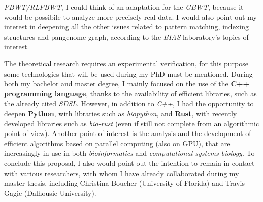 \documentclass[a4paper,11pt, oneside]{article}
\newcommand{\pb}[1]{\todo{\textbf{PB} #1}}
\newcommand{\dc}[1]{\todo{\textbf{DC} #1}}
\begin{document}
\begin{enumerate}[leftmargin=.2in]
  \textit{PBWT/RLPBWT}, I could think of an adaptation 
  for the \textit{GBWT}, because it would be possibile to
  analyze more precisely real data. I would also point out my interest in
  deepening all the other issues related to 
  pattern matching, indexing structures and pangenome graph, according to the
  \textit{BIAS} laboratory's topics of interest.
\end{enumerate}
\vspace{-1.25mm}
The theoretical research requires an experimental verification, for this purpose
some technologies that will be used during my PhD must be mentioned. 
During both my bachelor and master degree, I mainly focused on the use of the
\textbf{C++ programming language}, thanks to the
availability of efficient libraries, such as the already 
cited \textit{SDSL}. However, in
addition to \textit{C++}, I had the opportunity to deepen 
\textbf{Python}, with libraries such as \textit{biopython}, and \textbf{Rust},
with recently developed libraries such as \textit{bio-rust} (even if still not
complete from an algorithmic point of view). Another point of interest is the
analysis and the development of efficient algorithms based on parallel computing
(also on GPU), that are increasingly in use in both \textit{bioinformatics} and
\textit{computational systems biology}.  
To conclude this proposal, I also would point out the intention to remain in
contact with various researchers, with whom I have already collaborated during 
my master thesis, including Christina Boucher (University of Florida)
and Travis Gagie (Dalhousie University).
\end{document}
